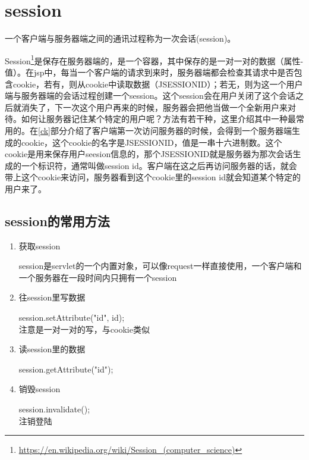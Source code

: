 \section{session}

一个客户端与服务器端之间的通讯过程称为一次会话(session)。

Session\footnote{\url{https://en.wikipedia.org/wiki/Session_(computer_science)}}是保存在服务器端的，是一个容器，其中保存的是一对一对的数据（属性-值）。在jsp中，每当一个客户端的请求到来时，服务器端都会检查其请求中是否包含cookie，若有，则从cookie中读取数据（JSESSIONID）；若无，则为这一个用户端与服务器端的会话过程创建一个session。这个session会在用户关闭了这个会话之后就消失了，下一次这个用户再来的时候，服务器会把他当做一个全新用户来对待。如何让服务器记住某个特定的用户呢？方法有若干种，这里介绍其中一种最常用的。在\ref{ck}部分介绍了客户端第一次访问服务器的时候，会得到一个服务器端生成的cookie，这个cookie的名字是JSESSIONID，值是一串十六进制数。这个cookie是用来保存用户seesion信息的，那个JSESSIONID就是服务器为那次会话生成的一个标识符，通常叫做session id。客户端在这之后再访问服务器的话，就会带上这个cookie来访问，服务器看到这个cookie里的session id就会知道某个特定的用户来了。
\subsection{session的常用方法}
\begin{enumerate}
\item
获取session

session是servlet的一个内置对象，可以像request一样直接使用，一个客户端和一个服务器在一段时间内只拥有一个session
\item
往session里写数据

session.setAttribute("id", id);\\注意是一对一对的写，与cookie类似

\item
读session里的数据

session.getAttribute("id");
\item
销毁session

session.invalidate();\\注销登陆
\end{enumerate}
